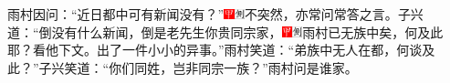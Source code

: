 雨村因问：``近日都中可有新闻没有？''{\includegraphics[width=3mm]{../Images/00002}\includegraphics[width=3mm]{../Images/00011}\footnotesize \kaishu 不突然，亦常问常答之言。}子兴道：``倒没有什么新闻，倒是老先生你贵同宗家，{\includegraphics[width=3mm]{../Images/00002}\includegraphics[width=3mm]{../Images/00011}\footnotesize \kaishu 雨村已无族中矣，何及此耶？看他下文。}出了一件小小的异事。''雨村笑道：``弟族中无人在都，何谈及此？''子兴笑道：``你们同姓，岂非同宗一族？''雨村问是谁家。

